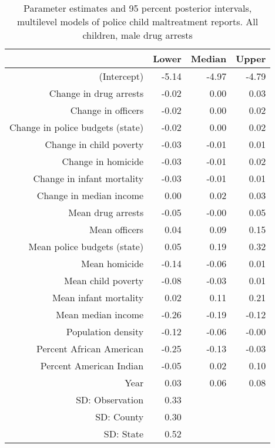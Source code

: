 \begin{table}[ht]
\centering
\begin{tabular}{rrrr}
  \hline
 & Lower & Median & Upper \\ 
  \hline
(Intercept) & -5.14 & -4.97 & -4.79 \\ 
  Change in drug arrests & -0.02 & 0.00 & 0.03 \\ 
  Change in officers & -0.02 & 0.00 & 0.02 \\ 
  Change in police budgets (state) & -0.02 & 0.00 & 0.02 \\ 
  Change in child poverty & -0.03 & -0.01 & 0.01 \\ 
  Change in homicide & -0.03 & -0.01 & 0.02 \\ 
  Change in infant mortality & -0.03 & -0.01 & 0.01 \\ 
  Change in median income & 0.00 & 0.02 & 0.03 \\ 
  Mean drug arrests & -0.05 & -0.00 & 0.05 \\ 
  Mean officers & 0.04 & 0.09 & 0.15 \\ 
  Mean police budgets (state) & 0.05 & 0.19 & 0.32 \\ 
  Mean homicide & -0.14 & -0.06 & 0.01 \\ 
  Mean child poverty & -0.08 & -0.03 & 0.01 \\ 
  Mean infant mortality & 0.02 & 0.11 & 0.21 \\ 
  Mean median income & -0.26 & -0.19 & -0.12 \\ 
  Population density & -0.12 & -0.06 & -0.00 \\ 
  Percent African American & -0.25 & -0.13 & -0.03 \\ 
  Percent American Indian & -0.05 & 0.02 & 0.10 \\ 
  Year & 0.03 & 0.06 & 0.08 \\ 
  SD: Observation & 0.33 &  &  \\ 
  SD: County & 0.30 &  &  \\ 
  SD: State & 0.52 &  &  \\ 
   \hline
\end{tabular}
\caption{Parameter estimates and 95 percent posterior intervals, multilevel models of 
             police child maltreatment reports. All children, male drug arrests} 
\end{table}
